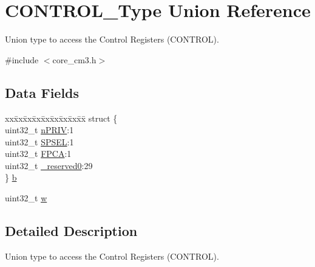 \hypertarget{unionCONTROL__Type}{\section{C\-O\-N\-T\-R\-O\-L\-\_\-\-Type Union Reference}
\label{unionCONTROL__Type}
}


Union type to access the Control Registers (C\-O\-N\-T\-R\-O\-L).  




{\ttfamily \#include $<$core\-\_\-cm3.\-h$>$}

\subsection*{Data Fields}
\begin{DoxyCompactItemize}
\item 
\begin{tabbing}
xx\=xx\=xx\=xx\=xx\=xx\=xx\=xx\=xx\=\kill
struct \{\\
\>uint32\_t \hyperlink{unionCONTROL__Type_a35c1732cf153b7b5c4bd321cf1de9605}{nPRIV}:1\\
\>uint32\_t \hyperlink{unionCONTROL__Type_a8cc085fea1c50a8bd9adea63931ee8e2}{SPSEL}:1\\
\>uint32\_t \hyperlink{unionCONTROL__Type_ac62cfff08e6f055e0101785bad7094cd}{FPCA}:1\\
\>uint32\_t \hyperlink{unionCONTROL__Type_af8c314273a1e4970a5671bd7f8184f50}{\_reserved0}:29\\
\} \hyperlink{unionCONTROL__Type_aa4d954e3b3024e7d3f2e7fb52b1cfa77}{b}\\

\end{tabbing}\item 
uint32\-\_\-t \hyperlink{unionCONTROL__Type_a6b642cca3d96da660b1198c133ca2a1f}{w}
\end{DoxyCompactItemize}


\subsection{Detailed Description}
Union type to access the Control Registers (C\-O\-N\-T\-R\-O\-L). 

